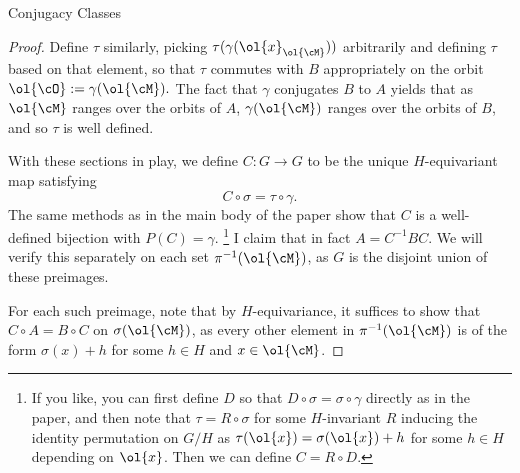 \documentclass[12nt]{article}
\theoremstyle{plain}
\begin{document}
\begin{subsection}{Conjugacy Classes}
\begin{proof}

Define $\tau$ similarly, picking $\tau(\gamma(\ol{x}_{\ol{\cM}}))$ arbitrarily and defining $\tau$ based on that element, so that $\tau$ commutes with $B$ appropriately on the orbit $\ol{\cO} := \gamma(\ol{\cM}).$ The fact that $\gamma$ conjugates $B$ to $A$ yields that as $\ol{\cM}$ ranges over the orbits of $A$, $\gamma(\ol{\cM})$ ranges over the orbits of $B$, and so $\tau$ is well defined. 

With these sections in play, we define $C : G \to G$ to be the unique $H$-equivariant map satisfying
\[
	C \circ \sigma = \tau \circ \gamma.
\]
The same methods as in the main body of the paper show that $C$ is a well-defined bijection with $P(C) = \gamma$. \footnote{If you like, you can first define $D$ so that $D \circ \sigma = \sigma \circ \gamma$ directly as in the paper, and then note that $\tau = R \circ \sigma$ for some $H$-invariant $R$ inducing the identity permutation on $G/H$ as $\tau(\ol{x}) = \sigma(\ol{x}) + h $ for some $h \in H$ depending on $\ol{x}$. Then we can define $C = R \circ D$. } I claim that in fact $A = C^{-1}BC$. We will verify this separately on each set $\pi^{-1}(\ol{\cM})$, as $G$ is the disjoint union of these preimages. 

For each such preimage, note that by $H$-equivariance, it suffices to show that $C \circ A = B \circ C$ on $\sigma(\ol{\cM})$, as every other element in $\pi^{-1}(\ol{\cM})$ is of the form $\sigma(x) + h$ for some $h \in H$ and $x \in \ol{\cM}$.


\end{proof}
\end{subsection}
\end{document}
